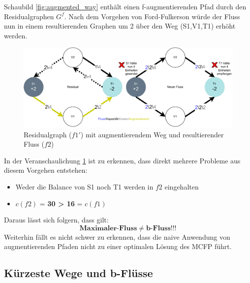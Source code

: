 Schaubild \ref{fig:augmented_way} enthält einen f-augmentierenden Pfad durch den Residualgraphen $G^f$. Nach dem Vorgehen von Ford-Fulkerson würde der Fluss nun in einem resultierenden Graphen um 2 über den Weg (S1,V1,T1) erhöht werden.
\begin{figure}[htb]
\centering
\includegraphics[width=1.0\textwidth]{img/steffen/augmented_way_with_resulting.drawio.pdf}
\caption{Residualgraph ($f1'$) mit augmentierendem Weg und resultierender Fluss ($f2$)}
\label{fig:augmented_way_with_resulting_graph}
\end{figure}
In der Veranschaulichung \ref{fig:augmented_way_with_resulting_graph} ist zu erkennen, dass direkt mehrere Probleme aus diesem Vorgehen entstehen:
\begin{itemize}
\item Weder die Balance von S1 noch T1 werden in $f2$ eingehalten
\item $c(f2)$ = \textbf{30 > 16} = $c(f1)$
\end{itemize}
Daraus lässt sich folgern, dass gilt:
\begin{equation}
    \textbf{Maximaler-Fluss} \neq \textbf{b-Fluss} !!!
\label{formular:st_flow_neq_b_flow}
\end{equation}
Weiterhin fällt es nicht schwer zu erkennen, dass die naive Anwendung von augmentierenden Pfaden nicht zu einer optimalen Lösung des MCFP führt.

\subsection{Kürzeste Wege und b-Flüsse}

